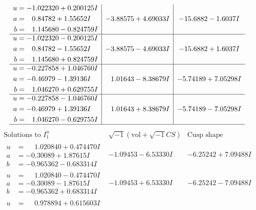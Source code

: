 \documentclass[1p]{elsarticle_modified}
\theoremstyle{definition}
\newcommand{\I}{\sqrt{-1}}
\begin{document}
$$\begin{array}{c|c|c}
\begin{aligned}
u &= -1.022320 + 0.200125 I \\
a &= \phantom{-}0.84782 + 1.55652 I \\
b &= \phantom{-}1.145680 - 0.824759 I\end{aligned}
 & -3.88575 + 4.69033 I & -15.6882 - 1.6037 I \\ \hline\begin{aligned}
u &= -1.022320 - 0.200125 I \\
a &= \phantom{-}0.84782 - 1.55652 I \\
b &= \phantom{-}1.145680 + 0.824759 I\end{aligned}
 & -3.88575 - 4.69033 I & -15.6882 + 1.6037 I \\ \hline\begin{aligned}
u &= -0.227858 + 1.046760 I \\
a &= -0.46979 - 1.39136 I \\
b &= \phantom{-}1.046270 + 0.629755 I\end{aligned}
 & \phantom{-}1.01643 - 8.38679 I & -5.74189 + 7.05298 I \\ \hline\begin{aligned}
u &= -0.227858 - 1.046760 I \\
a &= -0.46979 + 1.39136 I \\
b &= \phantom{-}1.046270 - 0.629755 I\end{aligned}
 & \phantom{-}1.01643 + 8.38679 I & -5.74189 - 7.05298 I\\
 \hline 
 \end{array}$$\newpage$$\begin{array}{c|c|c}  
\text{Solutions to }I^u_{1}& \I (\text{vol} + \sqrt{-1}CS) & \text{Cusp shape}\\
 \hline 
\begin{aligned}
u &= \phantom{-}1.020840 + 0.474470 I \\
a &= -0.30089 + 1.87615 I \\
b &= -0.965362 - 0.683314 I\end{aligned}
 & -1.09453 - 6.53330 I & -6.25242 + 7.09488 I \\ \hline\begin{aligned}
u &= \phantom{-}1.020840 - 0.474470 I \\
a &= -0.30089 - 1.87615 I \\
b &= -0.965362 + 0.683314 I\end{aligned}
 & -1.09453 + 6.53330 I & -6.25242 - 7.09488 I \\ \hline\begin{aligned}
u &= \phantom{-}0.978894 + 0.615603 I \\

\end{aligned}
\end{array}$$
\end{document}
